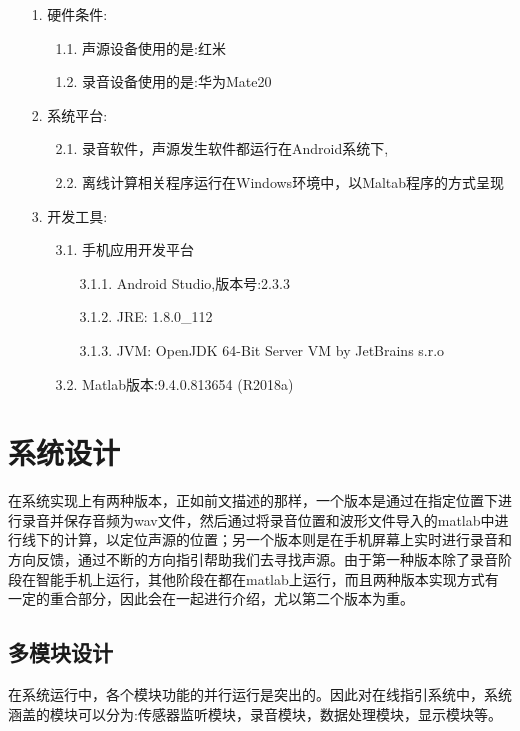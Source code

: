 \documentclass[winfonts]{njuthesis}
\begin{document}
		\begin{enumerate}
			\item[1.] 硬件条件:
				\begin{enumerate}
					\item[1.1.] 声源设备使用的是:红米
					\item[1.2.] 录音设备使用的是:华为Mate20
				\end{enumerate}
			\item[2.] 系统平台:
				\begin{enumerate}
					\item[2.1.] 录音软件，声源发生软件都运行在Android系统下,
					\item[2.2.] 离线计算相关程序运行在Windows环境中，以Maltab程序的方式呈现	
				\end{enumerate}
			\item[3.] 开发工具:
				\begin{enumerate}
					\item[3.1.] 手机应用开发平台
						\begin{enumerate}
							\item[3.1.1.] Android Studio,版本号:2.3.3
							\item[3.1.2.] JRE: 1.8.0\_112
							\item[3.1.3.] JVM: OpenJDK 64-Bit Server VM by JetBrains s.r.o		
						\end{enumerate}			
					\item[3.2.] Matlab版本:9.4.0.813654 (R2018a)
				\end{enumerate}	
		\end{enumerate}
	
	\section{系统设计}
	
		在系统实现上有两种版本，正如前文描述的那样，一个版本是通过在指定位置下进行录音并保存音频为wav文件，然后通过将录音位置和波形文件导入的matlab中进行线下的计算，以定位声源的位置；另一个版本则是在手机屏幕上实时进行录音和方向反馈，通过不断的方向指引帮助我们去寻找声源。由于第一种版本除了录音阶段在智能手机上运行，其他阶段在都在matlab上运行，而且两种版本实现方式有一定的重合部分，因此会在一起进行介绍，尤以第二个版本为重。
		
		\subsection{多模块设计}
		
			在系统运行中，各个模块功能的并行运行是突出的。因此对在线指引系统中，系统涵盖的模块可以分为:传感器监听模块，录音模块，数据处理模块，显示模块等。
			
\end{document}
